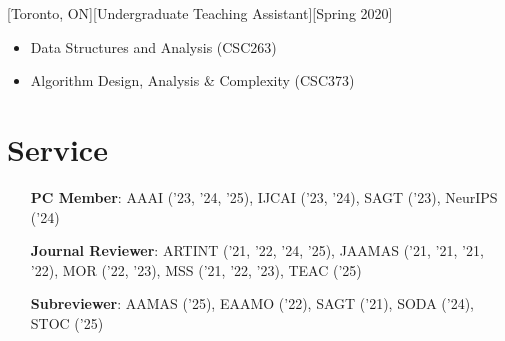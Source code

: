 \documentclass{article}
\begin{document}
    [Toronto, ON][Undergraduate Teaching Assistant][Spring 2020]
    \begin{itemize}
        \item Data Structures and Analysis (CSC263)
        \item Algorithm Design, Analysis \& Complexity (CSC373)
    \end{itemize}
    
    \section{Service}
    \begin{enumerate}[align=left]
    	\item[\textbf{PC Member}:] AAAI ('23, '24, '25), IJCAI ('23, '24), SAGT ('23), NeurIPS ('24)
    	\item[\textbf{Journal Reviewer}:] ARTINT ('21, '22, '24, '25), JAAMAS ('21, '21, '21, '22), MOR ('22, '23), MSS ('21, '22, '23), TEAC ('25)
    	\item[\textbf{Subreviewer}:] AAMAS ('25), EAAMO ('22), SAGT ('21), SODA ('24), STOC ('25)
    \end{enumerate}
    
\end{document}
